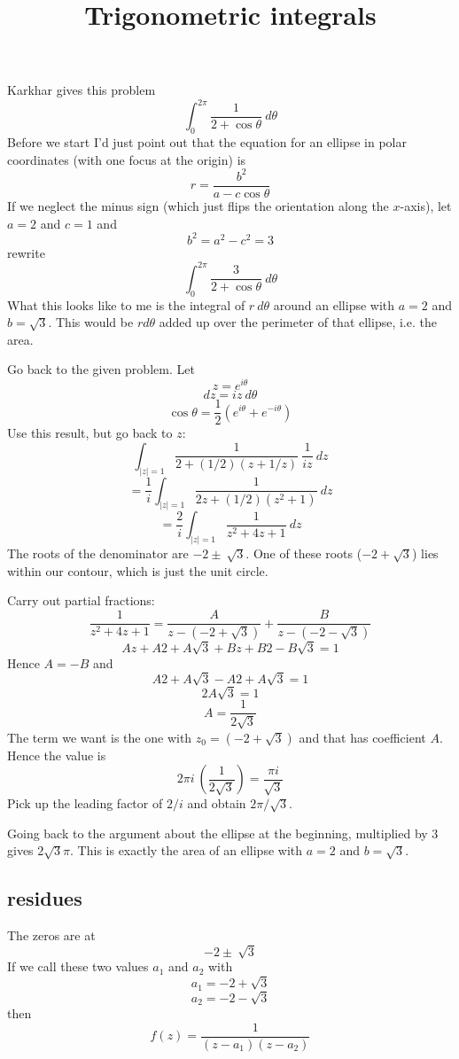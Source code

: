 \documentclass[11pt, oneside]{article}   	%
\title{Trigonometric integrals}
\date{}							%
\begin{document}
\maketitle
\Large
Karkhar gives this problem
\[ \int_0^{2\pi} \frac{1}{2 + \cos \theta} \ d \theta \]
Before we start I'd just point out that the equation for an ellipse in polar coordinates (with one focus at the origin) is
\[ r = \frac{b^2}{a - c \cos \theta} \]
If we neglect the minus sign (which just flips the orientation along the $x$-axis), let $a=2$ and $c=1$ and
\[ b^2 = a^2 - c^2 = 3 \]
rewrite
\[ \int_0^{2\pi} \frac{3}{2 + \cos \theta} \ d \theta \]
What this looks like to me is the integral of $r \ d \theta$ around an ellipse with $a = 2$ and $b = \sqrt{3}$.  This would be $r d \theta$ added up over the perimeter of that ellipse, i.e. the area.

Go back to the given problem.  Let
\[ z = e^{i\theta} \]
\[ dz = i z \ d \theta \]
\[ \cos \theta = \frac{1}{2}(e^{i\theta} + e^{-i \theta} ) \]
Use this result, but go back to $z$:
\[ \int_{|z|=1} \frac{1}{2 + (1/2)(z + 1/z)} \ \frac{1}{iz} \ dz \]
\[ = \frac{1}{i}  \int_{|z|=1} \frac{1}{2z + (1/2)(z^2 + 1)} \ dz \]
\[ = \frac{2}{i}  \int_{|z|=1} \frac{1}{z^2 + 4z + 1} \ dz \]
The roots of the denominator are $-2 \pm \ \sqrt{3}$.  One of these roots ($-2 + \sqrt{3}$) lies within our contour, which is just the unit circle.

Carry out partial fractions:
\[ \frac{1}{z^2 + 4z + 1} = \frac{A}{z - (-2 + \sqrt{3})} + \frac{B}{z - (-2 - \sqrt{3})} \]
\[ Az + A2 + A \sqrt{3} + Bz + B2 - B \sqrt{3} = 1 \]
Hence $A = -B$ and
\[ A2 + A \sqrt{3} -A2 + A \sqrt{3} = 1 \]
\[ 2A \sqrt{3} = 1 \]
\[ A = \frac{1}{2 \sqrt{3}} \]
The term we want is the one with $z_0 = (-2 + \sqrt{3})$ and that has coefficient $A$.  Hence the value is
\[ 2 \pi i \ (\frac{1}{2 \sqrt{3}}) = \frac{\pi i}{\sqrt{3}} \]
Pick up the leading factor of $2/i$ and obtain $2 \pi / \sqrt{3}$.

Going back to the argument about the ellipse at the beginning, multiplied by $3$ gives $2 \sqrt{3} \pi$.  This is exactly the area of an ellipse with $a = 2$ and $b = \sqrt{3}$.

\subsection*{residues}
The zeros are at 
\[ -2 \pm \ \sqrt{3} \]
If we call these two values $a_1$ and $a_2$ with
\[ a_1 = -2 + \sqrt{3} \]
\[ a_2 = -2 - \sqrt{3} \]
then
\[ f(z) = \frac{1}{(z - a_1)(z - a_2)} \]
\end{document}
